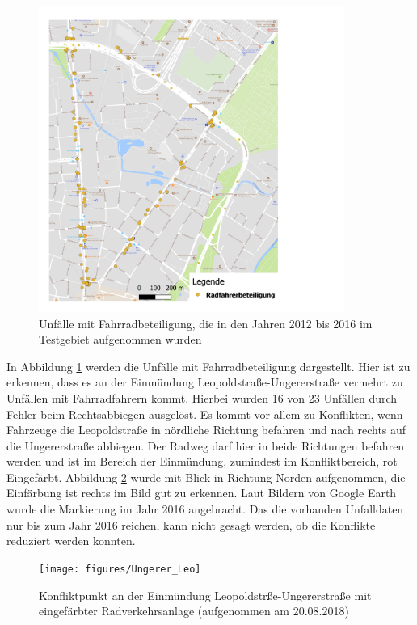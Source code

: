 \begin{savenotes}
	\begin{figure}[H]
		\centering
		\includegraphics[width=10cm,height=10cm]{figures/map_radfahrer}
		\caption[Unfälle mit Fahrradbeteiligung, die in den Jahren 2012 bis 2016 im Testgebiet aufgenommen wurden]{Unfälle mit Fahrradbeteiligung, die in den Jahren 2012 bis 2016 im Testgebiet aufgenommen wurden}\label{fig:map_radfahrer}
	\end{figure}
\end{savenotes}

In Abbildung \ref{fig:map_radfahrer} werden die Unfälle mit Fahrradbeteiligung dargestellt. Hier ist zu erkennen, dass es an der Einmündung Leopoldstraße-Ungererstraße vermehrt zu Unfällen mit Fahrradfahrern kommt. Hierbei wurden 16 von 23 Unfällen durch Fehler beim Rechtsabbiegen ausgelöst. Es kommt vor allem zu Konflikten, wenn Fahrzeuge die Leopoldstraße in nördliche Richtung befahren und nach rechts auf die Ungererstraße abbiegen. Der Radweg darf hier in beide Richtungen befahren werden und ist im Bereich der Einmündung, zumindest im Konfliktbereich, rot Eingefärbt. Abbildung \ref{fig:Konflikt_Ungerer_Leo} wurde mit Blick in Richtung Norden aufgenommen, die Einfärbung ist rechts im Bild gut zu erkennen. Laut Bildern von Google Earth wurde die Markierung im Jahr 2016 angebracht. Das die vorhanden Unfalldaten nur bis zum Jahr 2016 reichen, kann nicht gesagt werden, ob die Konflikte reduziert werden konnten.

\begin{savenotes}
	\begin{figure}[H]
		\centering
		\texttt{[image: figures/Ungerer\_Leo]}
		\caption[Konfliktpunkt an der Einmündung Leopoldstrße-Ungererstraße mit eingefärbter Radverkehrsanlage]{Konfliktpunkt an der Einmündung Leopoldstrße-Ungererstraße mit eingefärbter Radverkehrsanlage (aufgenommen am 20.08.2018)}\label{fig:Konflikt_Ungerer_Leo}
	\end{figure}
\end{savenotes}


